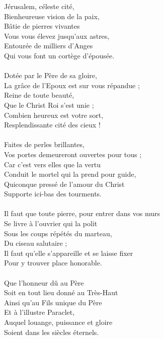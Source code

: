 Jérusalem, céleste cité,\\
Bienheureuse vision de la paix,\\
Bâtie de pierres vivantes\\
Vous vous élevez jusqu'aux astres,\\
Entourée de milliers d'Anges\\
Qui vous font un cortège d'épousée.\\
\\
Dotée par le Père de sa gloire,\\
La grâce de l'Epoux est sur vous répandue ;\\
Reine de toute beauté,\\
Que le Christ Roi s'est unie ;\\
Combien heureux est votre sort,\\
Resplendissante cité des cieux !\\
\\
Faites de perles brillantes,\\
Vos portes demeureront ouvertes pour tous ;\\
Car c'est vers elles que la vertu\\
Conduit le mortel qui la prend pour guide,\\
Quiconque pressé de l'amour du Christ\\
Supporte ici-bas des tourments.\\
\\
Il faut que toute pierre, pour entrer dans vos murs\\
Se livre à l'ouvrier qui la polit\\
Sous les coups répétés du marteau,\\
Du ciseau salutaire ;\\
Il faut qu'elle s'appareille et se laisse fixer\\
Pour y trouver place honorable.\\
\\
Que l’honneur dû au Père\\
Soit en tout lieu donné au Très-Haut\\
Ainsi qu’au Fils unique du Père\\
Et à l’illustre Paraclet,\\
Auquel louange, puissance et gloire\\
Soient dans les siècles éternels.